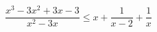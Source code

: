 \begin{ex}[type=inequality]
	\begin{condition}
		\( \dfrac{x^3-3x^2+3x-3}{x^2-3x}\le x+\dfrac{1}{x-2}+\dfrac{1}{x} \)
	\end{condition}
	\answer{\( (-\infty;0)\cup(0;1]\cup(2;3) \)}
\end{ex}